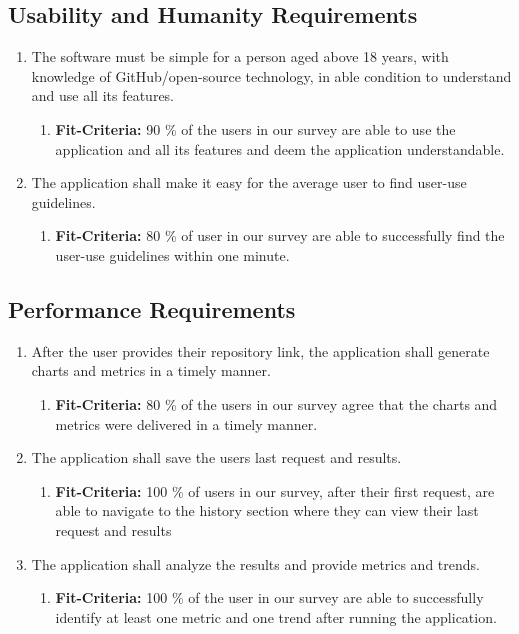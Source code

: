 \documentclass{article}
\begin{document}
\subsection{Usability and Humanity Requirements}
\begin{enumerate}
\item The software must be simple for a person aged above 18 years, with knowledge of GitHub/open-source technology, in able condition to understand and use all its features.
   \begin{enumerate}
    \item \textbf{Fit-Criteria:}  90 \% of the users in our survey are able to use the application and all its features and deem the application understandable.  
    \end{enumerate}
\item The application shall make it easy for the average user to find user-use guidelines.
   \begin{enumerate}
    \item \textbf{Fit-Criteria:}  80 \% of user in our survey are able to successfully find the user-use guidelines within one minute.
    \end{enumerate}
\end{enumerate}


\subsection{Performance Requirements}
\begin{enumerate}
\item After the user provides their repository link, the application shall generate charts and metrics in a timely manner. 
   \begin{enumerate}
    \item \textbf{Fit-Criteria:}  80 \% of the users in our survey agree that the charts and metrics were delivered in a timely manner. 
    \end{enumerate}
\item The application shall save the users last request and results. 
   \begin{enumerate}
    \item \textbf{Fit-Criteria:}  100 \% of users  in our survey, after their first request,  are able to navigate to the  history section where they can view their last request and results
    \end{enumerate}
\item The application shall analyze the results and provide metrics and trends. 
   \begin{enumerate}
    \item \textbf{Fit-Criteria:}   100 \% of the user in our survey are able to successfully identify at least one metric and one trend after running the application. 
    \end{enumerate}
\end{enumerate}
\end{document}
